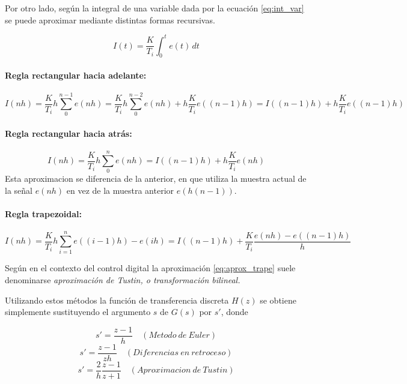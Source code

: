 \documentclass[10pt,conference,a4paper,onecolumn]{article}%
\begin{document}
  Por otro lado, según \cite[pág. 46 ]{biblia_PID} la integral de una variable dada por la ecuación \ref{eq:int_var} se puede aproximar mediante  distintas formas recursivas.
  
\begin{equation}
I(t)=\frac{K}{T_i}\int_0^t e(t) \,dt
\label{eq:int_var}
\end{equation}  
  
  \paragraph{Regla rectangular hacia adelante:} 
  
  \begin{equation}
  I(nh)=\frac{K}{T_i}h \sum_0^{n-1}e(nh)= \frac{K}{T_i}h \sum_0^{n-2}e(nh) + h\frac{K}{T_i} e((n-1)h)=I((n-1)h)+  h\frac{K}{T_i} e((n-1)h)
  \end{equation}
  
  \paragraph{Regla rectangular hacia atrás:} 
  \begin{equation}
  I(nh)=\frac{K}{T_i}h \sum_0^{n}e(nh)=I((n-1)h)+  h\frac{K}{T_i} e(nh)
  \end{equation}
  Esta aproximacion se diferencia de la anterior, en que utiliza la muestra actual de la señal $e(nh)$ en vez de la muestra anterior $e(h(n-1))$.
  
  \paragraph{Regla trapezoidal:} 
  
  \begin{equation}
  I(nh)=\frac{K}{T_i}h \sum_{i=1}^{n}e((i-1)h)-e(ih)=I((n-1)h)+  \frac{K}{T_i} \frac{e(nh) -e((n-1)h)}{h}
  \label{eq:aprox_trape} 
  \end{equation}
  
  Según \cite{astrom} en el contexto del control digital la aproximación \ref{eq:aprox_trape} suele denominarse \textit{aproximación de Tustin, o transformación bilineal.}
  
  Utilizando estos métodos la función de transferencia discreta $H(z)$ se obtiene simplemente sustituyendo el argumento $s$ de $G(s)$ por $s'$, donde
  
  \begin{equation}
  s'=\frac{z-1}{h} \quad (Metodo\ de\ Euler)
  \label{eq:Euler}
\end{equation}   
  \begin{equation}
  s'=\frac{z-1}{zh} \quad (Diferencias\ en\ retroceso)
  \label{eq:dif_retroceso}
\end{equation}   
\begin{equation}
  s'=\frac{2}{h} \frac{z-1}{z+1} \quad (Aproximacion\ de\ Tustin)
\end{equation}  
\end{document}
